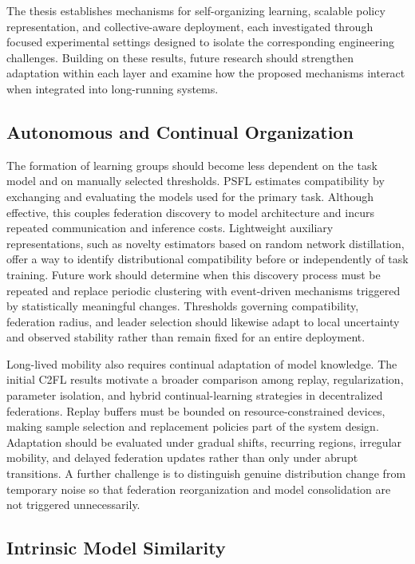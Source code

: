 The thesis establishes mechanisms for self-organizing learning,
 scalable policy representation, and collective-aware deployment, 
 each investigated through focused experimental settings designed to isolate 
 the corresponding engineering challenges.
%
Building on these results, 
 future research should strengthen adaptation within each layer and examine how the proposed mechanisms 
 interact when integrated into long-running systems.

\subsection{Autonomous and Continual Organization}

The formation of learning groups should become less dependent 
 on the task model and on manually selected thresholds.
%
PSFL estimates compatibility by exchanging 
 and evaluating the models used for the primary task. 
% 
Although effective, 
 this couples federation discovery to model architecture 
 and incurs repeated communication and inference costs.
%
Lightweight auxiliary representations, 
 such as novelty estimators based on random network distillation, 
 offer a way to identify distributional compatibility before or independently of task training. 
% 
Future work should determine when this discovery process must be repeated 
 and replace periodic clustering with event-driven mechanisms 
 triggered by statistically meaningful changes.
%
Thresholds governing compatibility, federation radius, 
 and leader selection should likewise adapt to local uncertainty 
 and observed stability rather than remain fixed for an entire deployment.

Long-lived mobility also requires continual adaptation of model knowledge.
%
The initial C2FL results motivate a broader comparison among replay, regularization, 
parameter isolation, and hybrid continual-learning strategies in decentralized federations. 
%
Replay buffers must be bounded on resource-constrained devices, 
 making sample selection and replacement policies part of the system design. 
% 
Adaptation should be evaluated under gradual shifts, recurring regions, irregular mobility, 
 and delayed federation updates rather than only under abrupt transitions. 
% 
A further challenge is to distinguish genuine distribution change from temporary noise 
 so that federation reorganization and model consolidation are not triggered unnecessarily.

\subsection{Intrinsic Model Similarity}

